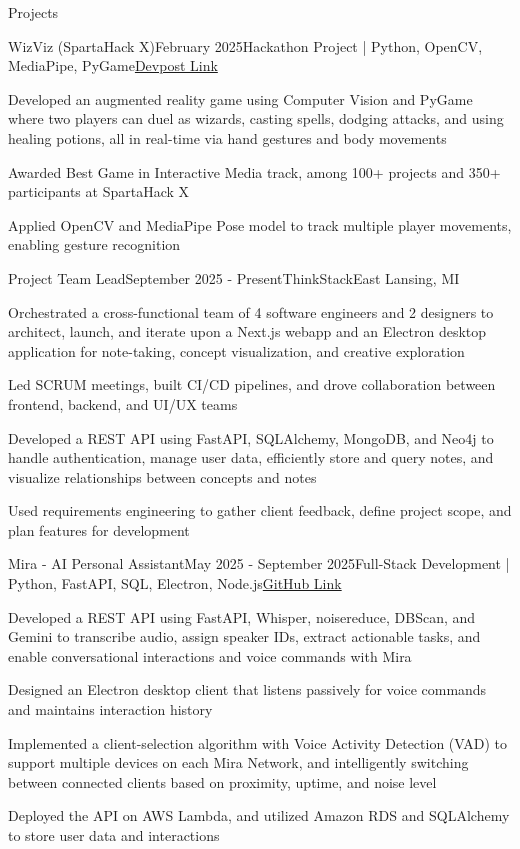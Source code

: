 \documentclass[
	11pt
]{resume}
\begin{document}
	\begin{rSection}{P}{rojects}
		\begin{rSectionEntry}{WizViz (SpartaHack X)}{February 2025}{Hackathon Project | Python, OpenCV, MediaPipe, PyGame}{\href{https://devpost.com/software/wizviz}{Devpost Link}}
			\item Developed an augmented reality game using Computer Vision and PyGame where two players can duel as wizards, casting spells, dodging attacks, and using healing potions, all in real-time via hand gestures and body movements
			\item Awarded Best Game in Interactive Media track, among 100+ projects and 350+ participants at SpartaHack X
			\item Applied OpenCV and MediaPipe Pose model to track multiple player movements, enabling gesture recognition
		\end{rSectionEntry}

		\begin{rSectionEntry}{Project Team Lead}{September 2025 - Present}{ThinkStack}{East Lansing, MI}
			\item Orchestrated a cross-functional team of 4 software engineers and 2 designers to architect, launch, and iterate upon a Next.js webapp and an Electron desktop application for note-taking, concept visualization, and creative exploration
			\item Led SCRUM meetings, built CI/CD pipelines, and drove collaboration between frontend, backend, and UI/UX teams
			\item Developed a REST API using FastAPI, SQLAlchemy, MongoDB, and Neo4j to handle authentication, manage user data, efficiently store and query notes, and visualize relationships between concepts and notes
			\item Used requirements engineering to gather client feedback, define project scope, and plan features for development
		\end{rSectionEntry}

		\begin{rSectionEntry}{Mira - AI Personal Assistant}{May 2025 - September 2025}{Full-Stack Development | Python, FastAPI, SQL, Electron, Node.js}{\href{https://github.com/mira-assistant}{GitHub Link}}
			\item Developed a REST API using FastAPI, Whisper, noisereduce, DBScan, and Gemini to transcribe audio, assign speaker IDs, extract actionable tasks, and enable conversational interactions and voice commands with Mira
			\item Designed an Electron desktop client that listens passively for voice commands and maintains interaction history
			\item Implemented a client-selection algorithm with Voice Activity Detection (VAD) to support multiple devices on each Mira Network, and intelligently switching between connected clients based on proximity, uptime, and noise level
			\item Deployed the API on AWS Lambda, and utilized Amazon RDS and SQLAlchemy to store user data and interactions
		\end{rSectionEntry}
	\end{rSection}
\end{document}
